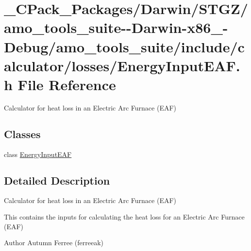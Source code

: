 \hypertarget{___c_pack___packages_2_darwin_2_s_t_g_z_2amo__tools__suite--_darwin-x86__64-_debug_2amo__tools__43e9a089c1ddf4438f079e8c0aee2b56}{}\section{\+\_\+\+C\+Pack\+\_\+\+Packages/\+Darwin/\+S\+T\+G\+Z/amo\+\_\+tools\+\_\+suite-\/-\/\+Darwin-\/x86\+\_-\/\+Debug/amo\+\_\+tools\+\_\+suite/include/calculator/losses/\+Energy\+Input\+E\+AF.h File Reference}
\label{___c_pack___packages_2_darwin_2_s_t_g_z_2amo__tools__suite--_darwin-x86__64-_debug_2amo__tools__43e9a089c1ddf4438f079e8c0aee2b56}


Calculator for heat loss in an Electric Arc Furnace (E\+AF)  


\subsection*{Classes}
\begin{DoxyCompactItemize}
\item 
class \hyperlink{class_energy_input_e_a_f}{Energy\+Input\+E\+AF}
\end{DoxyCompactItemize}


\subsection{Detailed Description}
Calculator for heat loss in an Electric Arc Furnace (E\+AF) 

This contains the inputs for calculating the heat loss for an Electric Arc Furnace (E\+AF)

\begin{DoxyAuthor}{Author}
Autumn Ferree (ferreeak) 
\end{DoxyAuthor}
